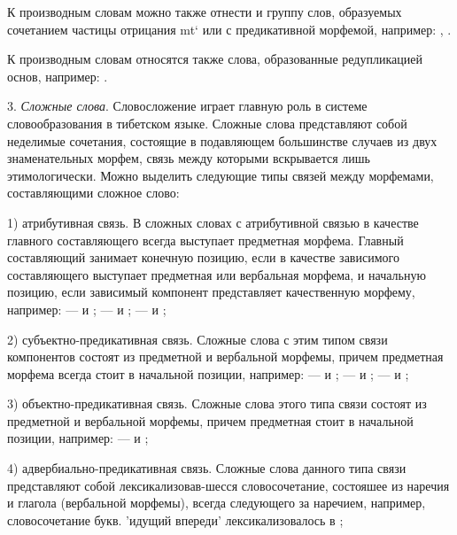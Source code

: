 К производным словам можно также отнести и группу слов, образуемых сочетанием частицы отрицания  mt‘
или  с предикативной морфемой, например: , .

К производным словам относятся также слова, образованные редупликацией основ, например: .

3. \emph{Сложные слова}. Словосложение играет главную роль в системе словообразования в тибетском языке. Сложные слова представляют собой неделимые сочетания, состоящие в подавляющем большинстве случаев из двух знаменательных морфем, связь между которыми вскрывается лишь этимологически. Можно выделить следующие типы связей между морфемами, составляющими сложное слово:

1) атрибутивная связь. В сложных словах с атрибутивной связью в качестве главного составляющего всегда выступает предметная морфема. Главный составляющий занимает конечную позицию, если в качестве зависимого составляющего выступает предметная или вербальная морфема, и начальную позицию, если зависимый компонент представляет качественную морфему, например: 
 ---  и ;
 ---  и ;
 ---  и ;

2) субъектно-предикативная связь. Сложные слова с этим типом связи компонентов состоят из предметной и вербальной морфемы, причем предметная морфема всегда стоит в начальной позиции, например:
 ---  и ;
 ---  и ;
 ---  и ;

3) объектно-предикативная связь. Сложные слова этого типа связи состоят из предметной и вербальной морфемы, причем предметная стоит в начальной позиции, например:  ---  и ;

4) адвербиально-предикативная связь. Сложные слова
данного типа связи представляют собой лексикализовав-шесся словосочетание, состояшее из наречия и глагола (вербальной морфемы), всегда следующего за наречием, например, словосочетание  букв. 'идущий впереди'	лексикализовалось в ;

